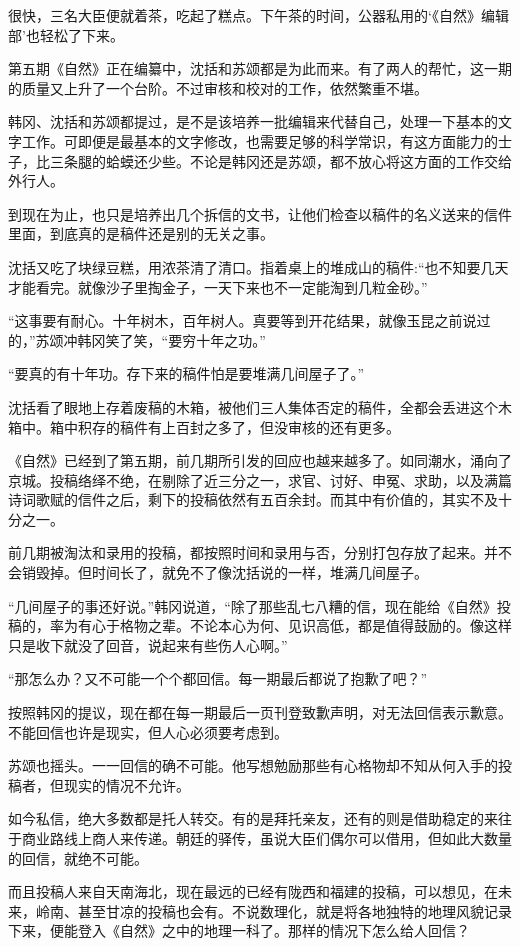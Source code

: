 很快，三名大臣便就着茶，吃起了糕点。下午茶的时间，公器私用的‘《自然》编辑部’也轻松了下来。

第五期《自然》正在编纂中，沈括和苏颂都是为此而来。有了两人的帮忙，这一期的质量又上升了一个台阶。不过审核和校对的工作，依然繁重不堪。

韩冈、沈括和苏颂都提过，是不是该培养一批编辑来代替自己，处理一下基本的文字工作。可即便是最基本的文字修改，也需要足够的科学常识，有这方面能力的士子，比三条腿的蛤蟆还少些。不论是韩冈还是苏颂，都不放心将这方面的工作交给外行人。

到现在为止，也只是培养出几个拆信的文书，让他们检查以稿件的名义送来的信件里面，到底真的是稿件还是别的无关之事。

沈括又吃了块绿豆糕，用浓茶清了清口。指着桌上的堆成山的稿件:“也不知要几天才能看完。就像沙子里掏金子，一天下来也不一定能淘到几粒金砂。”

“这事要有耐心。十年树木，百年树人。真要等到开花结果，就像玉昆之前说过的，”苏颂冲韩冈笑了笑，“要穷十年之功。”

“要真的有十年功。存下来的稿件怕是要堆满几间屋子了。”

沈括看了眼地上存着废稿的木箱，被他们三人集体否定的稿件，全都会丢进这个木箱中。箱中积存的稿件有上百封之多了，但没审核的还有更多。

《自然》已经到了第五期，前几期所引发的回应也越来越多了。如同潮水，涌向了京城。投稿络绎不绝，在剔除了近三分之一，求官、讨好、申冤、求助，以及满篇诗词歌赋的信件之后，剩下的投稿依然有五百余封。而其中有价值的，其实不及十分之一。

前几期被淘汰和录用的投稿，都按照时间和录用与否，分别打包存放了起来。并不会销毁掉。但时间长了，就免不了像沈括说的一样，堆满几间屋子。

“几间屋子的事还好说。”韩冈说道，“除了那些乱七八糟的信，现在能给《自然》投稿的，率为有心于格物之辈。不论本心为何、见识高低，都是值得鼓励的。像这样只是收下就没了回音，说起来有些伤人心啊。”

“那怎么办？又不可能一个个都回信。每一期最后都说了抱歉了吧？”

按照韩冈的提议，现在都在每一期最后一页刊登致歉声明，对无法回信表示歉意。不能回信也许是现实，但人心必须要考虑到。

苏颂也摇头。一一回信的确不可能。他写想勉励那些有心格物却不知从何入手的投稿者，但现实的情况不允许。

如今私信，绝大多数都是托人转交。有的是拜托亲友，还有的则是借助稳定的来往于商业路线上商人来传递。朝廷的驿传，虽说大臣们偶尔可以借用，但如此大数量的回信，就绝不可能。

而且投稿人来自天南海北，现在最远的已经有陇西和福建的投稿，可以想见，在未来，岭南、甚至甘凉的投稿也会有。不说数理化，就是将各地独特的地理风貌记录下来，便能登入《自然》之中的地理一科了。那样的情况下怎么给人回信？

